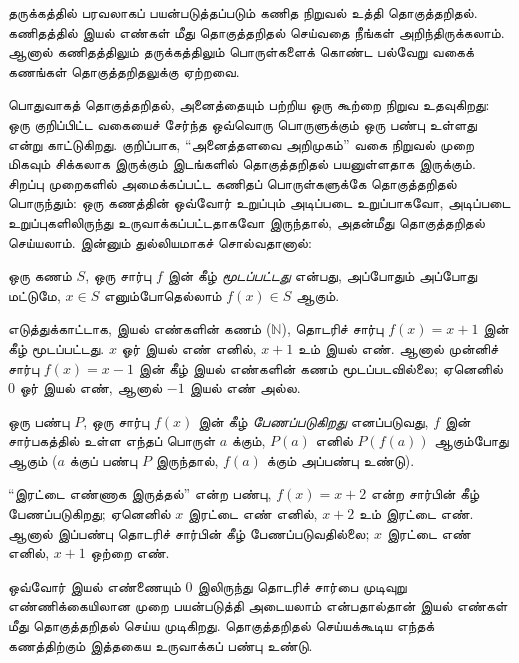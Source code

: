 \documentclass[../../../include/open-logic-section]{subfiles}
\begin{document}


\begin{explain}
தருக்கத்தில் பரவலாகப் பயன்படுத்தப்படும் கணித நிறுவல் உத்தி
தொகுத்தறிதல். கணிதத்தில் இயல் எண்கள் மீது தொகுத்தறிதல் செய்வதை
நீங்கள் அறிந்திருக்கலாம். ஆனால் கணிதத்திலும் தருக்கத்திலும்
பொருள்களைக் கொண்ட பல்வேறு வகைக் கணங்கள் தொகுத்தறிதலுக்கு ஏற்றவை.

பொதுவாகத் தொகுத்தறிதல், அனைத்தையும் பற்றிய ஒரு கூற்றை நிறுவ
உதவுகிறது: ஒரு குறிப்பிட்ட வகையைச் சேர்ந்த ஒவ்வொரு பொருளுக்கும்
ஒரு பண்பு உள்ளது என்று காட்டுகிறது. குறிப்பாக,
``அனைத்தளவை அறிமுகம்'' வகை நிறுவல் முறை மிகவும் சிக்கலாக இருக்கும்
இடங்களில் தொகுத்தறிதல் பயனுள்ளதாக இருக்கும். சிறப்பு முறைகளில்
அமைக்கப்பட்ட கணிதப் பொருள்களுக்கே தொகுத்தறிதல் பொருந்தும்:
ஒரு கணத்தின் ஒவ்வோர் உறுப்பும் அடிப்படை உறுப்பாகவோ,
அடிப்படை உறுப்புகளிலிருந்து உருவாக்கப்பட்டதாகவோ இருந்தால்,
அதன்மீது தொகுத்தறிதல் செய்யலாம். இன்னும் துல்லியமாகச் சொல்வதானால்:
\end{explain}

\begin{defn}
ஒரு கணம் $S$, ஒரு சார்பு $f$ இன் கீழ் \emph{மூடப்பட்டது}
என்பது, அப்போதும் அப்போது மட்டுமே, $x \in S$ எனும்போதெல்லாம்
$f(x) \in S$ ஆகும்.
\end{defn}

\begin{explain}
எடுத்துக்காட்டாக, இயல் எண்களின் கணம் ($\mathbb{N}$),
தொடரிச் சார்பு $f(x) = x+1$ இன் கீழ் மூடப்பட்டது.
$x$ ஓர் இயல் எண் எனில், $x+1$ உம் இயல் எண்.
ஆனால் முன்னிச் சார்பு $f(x) = x-1$ இன் கீழ் இயல் எண்களின்
கணம் மூடப்படவில்லை; ஏனெனில் $0$ ஓர் இயல் எண்,
ஆனால் $-1$ இயல் எண் அல்ல.
\end{explain}

\begin{defn}
ஒரு பண்பு $P$, ஒரு சார்பு $f(x)$ இன் கீழ் \emph{பேணப்படுகிறது}
எனப்படுவது, $f$ இன் சார்பகத்தில் உள்ள எந்தப் பொருள் $a$ க்கும்,
$P(a)$ எனில் $P(f(a))$ ஆகும்போது ஆகும்
($a$ க்குப் பண்பு $P$ இருந்தால், $f(a)$ க்கும் அப்பண்பு உண்டு).
\end{defn}

\begin{explain}
``இரட்டை எண்ணாக இருத்தல்'' என்ற பண்பு, $f(x) = x+2$
என்ற சார்பின் கீழ் பேணப்படுகிறது; ஏனெனில் $x$ இரட்டை எண்
எனில், $x+2$ உம் இரட்டை எண். ஆனால் இப்பண்பு தொடரிச்
சார்பின் கீழ் பேணப்படுவதில்லை; $x$ இரட்டை எண் எனில்,
$x+1$ ஒற்றை எண்.

ஒவ்வோர் இயல் எண்ணையும் 0 இலிருந்து தொடரிச் சார்பை முடிவுறு
எண்ணிக்கையிலான முறை பயன்படுத்தி அடையலாம் என்பதால்தான்
இயல் எண்கள் மீது தொகுத்தறிதல் செய்ய முடிகிறது.
தொகுத்தறிதல் செய்யக்கூடிய எந்தக் கணத்திற்கும் இத்தகைய
உருவாக்கப் பண்பு உண்டு.
\end{explain}
\end{document}
